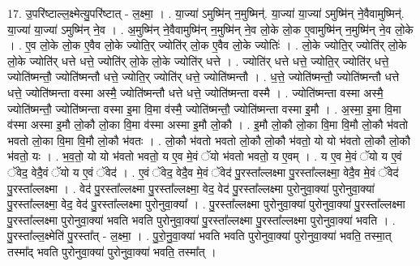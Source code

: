 \documentclass[17pt]{extarticle}
\begin{document}
17. उ॒परि॑ष्टाल्ल॒क्ष्मेत्यु॒परि॑ष्टात् - ल॒क्ष्मा॒ । . या॒ज्या॑ ऽमुष्मि॑न् न॒मुष्मिन्॑. या॒ज्या॑ या॒ज्या॑ ऽमुष्मि॑न् ने॒वैवामुष्मिन्॑. या॒ज्या॑ या॒ज्या॑ ऽमुष्मि॑न् ने॒व । . अ॒मुष्मि॑न् ने॒वैवामुष्मि॑न् न॒मुष्मि॑न् ने॒व लो॒के लो॒क ए॒वामुष्मि॑न् न॒मुष्मि॑न् ने॒व लो॒के । . ए॒व लो॒के लो॒क ए॒वैव लो॒के ज्योति॒र् ज्योति॑र् लो॒क ए॒वैव लो॒के ज्योतिः॑ । . लो॒के ज्योति॒र् ज्योति॑र् लो॒के लो॒के ज्योति॑र् धत्ते धत्ते॒ ज्योति॑र् लो॒के लो॒के ज्योति॑र् धत्ते । . ज्योति॑र् धत्ते धत्ते॒ ज्योति॒र् ज्योति॑र् धत्ते॒ ज्योति॑ष्मन्तौ॒ ज्योति॑ष्मन्तौ धत्ते॒ ज्योति॒र् ज्योति॑र् धत्ते॒ ज्योति॑ष्मन्तौ । . ध॒त्ते॒ ज्योति॑ष्मन्तौ॒ ज्योति॑ष्मन्तौ धत्ते धत्ते॒ ज्योति॑ष्मन्ता वस्मा अस्मै॒ ज्योति॑ष्मन्तौ धत्ते धत्ते॒ ज्योति॑ष्मन्ता वस्मै । . ज्योति॑ष्मन्ता वस्मा अस्मै॒ ज्योति॑ष्मन्तौ॒ ज्योति॑ष्मन्ता वस्मा इ॒मा वि॒मा व॑स्मै॒ ज्योति॑ष्मन्तौ॒ ज्योति॑ष्मन्ता वस्मा इ॒मौ । . अ॒स्मा॒ इ॒मा वि॒मा व॑स्मा अस्मा इ॒मौ लो॒कौ लो॒का वि॒मा व॑स्मा अस्मा इ॒मौ लो॒कौ । . इ॒मौ लो॒कौ लो॒का वि॒मा वि॒मौ लो॒कौ भ॑वतो भवतो लो॒का वि॒मा वि॒मौ लो॒कौ भ॑वतः । . लो॒कौ भ॑वतो भवतो लो॒कौ लो॒कौ भ॑वतो॒ यो यो भ॑वतो लो॒कौ लो॒कौ भ॑वतो॒ यः । . भ॒व॒तो॒ यो यो भ॑वतो भवतो॒ य ए॒व मे॒वं ॅयो भ॑वतो भवतो॒ य ए॒वम् । . य ए॒व मे॒वं ॅयो य ए॒वं ॅवेद॒ वेदै॒वं ॅयो य ए॒वं ॅवेद॑ । . ए॒वं ॅवेद॒ वेदै॒व मे॒वं ॅवेद॑ पु॒रस्ता᳚ल्लक्ष्मा पु॒रस्ता᳚ल्लक्ष्मा॒ वेदै॒व मे॒वं ॅवेद॑ पु॒रस्ता᳚ल्लक्ष्मा । . वेद॑ पु॒रस्ता᳚ल्लक्ष्मा पु॒रस्ता᳚ल्लक्ष्मा॒ वेद॒ वेद॑ पु॒रस्ता᳚ल्लक्ष्मा पुरोनुवा॒क्या॑ पुरोनुवा॒क्या॑ पु॒रस्ता᳚ल्लक्ष्मा॒ वेद॒ वेद॑ पु॒रस्ता᳚ल्लक्ष्मा पुरोनुवा॒क्या᳚ । . पु॒रस्ता᳚ल्लक्ष्मा पुरोनुवा॒क्या॑ पुरोनुवा॒क्या॑ पु॒रस्ता᳚ल्लक्ष्मा पु॒रस्ता᳚ल्लक्ष्मा पुरोनुवा॒क्या॑ भवति भवति पुरोनुवा॒क्या॑ पु॒रस्ता᳚ल्लक्ष्मा पु॒रस्ता᳚ल्लक्ष्मा पुरोनुवा॒क्या॑ भवति । . पु॒रस्ता᳚ल्ल॒क्ष्मेति॑ पु॒रस्ता᳚त् - ल॒क्ष्मा॒ । . पु॒रो॒नु॒वा॒क्या॑ भवति भवति पुरोनुवा॒क्या॑ पुरोनुवा॒क्या॑ भवति॒ तस्मा॒त् तस्मा᳚द् भवति पुरोनुवा॒क्या॑ पुरोनुवा॒क्या॑ भवति॒ तस्मा᳚त् । \newline
\end{document}
